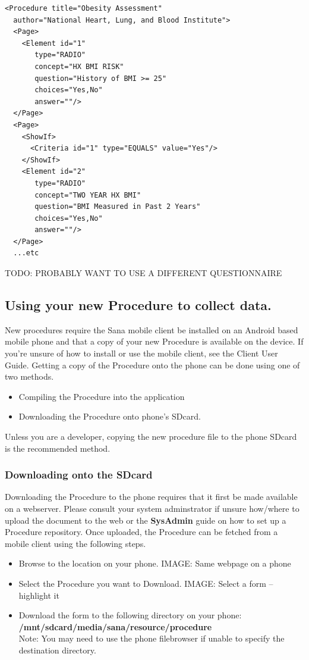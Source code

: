 \documentclass[a4paper,10pt]{article}
\begin{document}
\begin{verbatim}
<Procedure title="Obesity Assessment" 
  author="National Heart, Lung, and Blood Institute">
  <Page>
    <Element id="1"
       type="RADIO" 
       concept="HX BMI RISK"
       question="History of BMI >= 25"
       choices="Yes,No"  
       answer=""/>
  </Page>
  <Page>
    <ShowIf>
      <Criteria id="1" type="EQUALS" value="Yes"/>
    </ShowIf>
    <Element id="2"
       type="RADIO" 
       concept="TWO YEAR HX BMI"
       question="BMI Measured in Past 2 Years"
       choices="Yes,No"  
       answer=""/>
  </Page>
  ...etc
\end{verbatim}

TODO: PROBABLY WANT TO USE A DIFFERENT QUESTIONNAIRE

\subsection{Using your new Procedure to collect data.}
New procedures require the Sana mobile client be installed on an Android based
mobile phone and that a copy of your new Procedure is available on the device.
If you're unsure of how to install or use the mobile client, see the 
Client User Guide. Getting a copy of the Procedure onto the phone can be done 
using one of two methods.

\begin{itemize}
 \item Compiling the Procedure into the application
 \item Downloading the Procedure onto phone's SDcard.
\end{itemize}
Unless you are a developer, copying the new procedure file to the phone SDcard
is the recommended method. 

\subsubsection{Downloading onto the SDcard}
Downloading the Procedure to the phone requires that it first be made available
on a webserver. Please consult your system adminstrator if unsure how/where to
upload the document to the web or the \textbf{SysAdmin} guide on how to set up a
Procedure repository. Once uploaded, the Procedure can be fetched from a mobile
client using the following steps.

\begin{itemize}
 \item Browse to the location on your phone.
      {IMAGE: Same webpage on a phone}
 \item Select the Procedure you want to Download.
  {IMAGE: Select a form --highlight it}
 \item Download the form to the following directory on your phone: \\ 
    \textbf{/mnt/sdcard/media/sana/resource/procedure} \\
  Note: You may need to use the phone filebrowser if unable to specify the
  destination directory.
\end{itemize}
\end{document}
